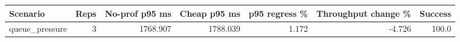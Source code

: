 \begin{tabular}{lrrrrrr}
\hline
Scenario & Reps & No-prof p95 ms & Cheap p95 ms & p95 regress \% & Throughput change \% & Success \\
\hline
queue_pressure & 3 & 1768.907 & 1788.039 & 1.172 & -4.726 & 100.0 \\
\hline
\end{tabular}
